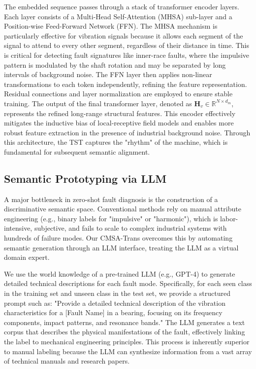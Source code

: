 The embedded sequence passes through a stack of transformer encoder layers. Each layer consists of a Multi-Head Self-Attention (MHSA) sub-layer and a Position-wise Feed-Forward Network (FFN). The MHSA mechanism is particularly effective for vibration signals because it allows each segment of the signal to attend to every other segment, regardless of their distance in time. This is critical for detecting fault signatures like inner-race faults, where the impulsive pattern is modulated by the shaft rotation and may be separated by long intervals of background noise. The FFN layer then applies non-linear transformations to each token independently, refining the feature representation. Residual connections and layer normalization are employed to ensure stable training. The output of the final transformer layer, denoted as $\mathbf{H}_v \in \mathbb{R}^{N \times d_m}$, represents the refined long-range structural features. This encoder effectively mitigates the inductive bias of local-receptive field models and enables more robust feature extraction in the presence of industrial background noise. Through this architecture, the TST captures the "rhythm" of the machine, which is fundamental for subsequent semantic alignment.

\subsection{Semantic Prototyping via LLM}
A major bottleneck in zero-shot fault diagnosis is the construction of a discriminative semantic space. Conventional methods rely on manual attribute engineering (e.g., binary labels for "impulsive" or "harmonic"), which is labor-intensive, subjective, and fails to scale to complex industrial systems with hundreds of failure modes. Our CMSA-Trans overcomes this by automating semantic generation through an LLM interface, treating the LLM as a virtual domain expert.

We use the world knowledge of a pre-trained LLM (e.g., GPT-4) to generate detailed technical descriptions for each fault mode. Specifically, for each seen class in the training set and unseen class in the test set, we provide a structured prompt such as: "Provide a detailed technical description of the vibration characteristics for a [Fault Name] in a bearing, focusing on its frequency components, impact patterns, and resonance bands." The LLM generates a text corpus that describes the physical manifestations of the fault, effectively linking the label to mechanical engineering principles. This process is inherently superior to manual labeling because the LLM can synthesize information from a vast array of technical manuals and research papers.


